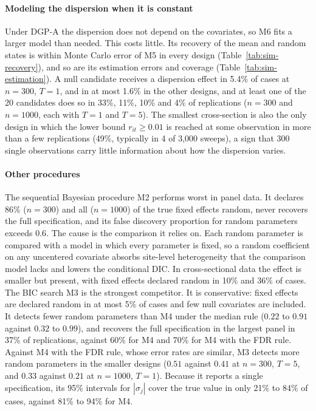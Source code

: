 \paragraph{Modeling the dispersion when it is constant} Under DGP-A the dispersion does not depend on the covariates, so M6 fits a larger model than needed. This costs little. Its recovery of the mean and random states is within Monte Carlo error of M5 in every design (Table~\ref{tab:sim-recovery}), and so are its estimation errors and coverage (Table~\ref{tab:sim-estimation}). A null candidate receives a dispersion effect in 5.4\% of cases at $n=300$, $T=1$, and in at most 1.6\% in the other designs, and at least one of the 20 candidates does so in 33\%, 11\%, 10\% and 4\% of replications ($n=300$ and $n=1000$, each with $T=1$ and $T=5$). The smallest cross-section is also the only design in which the lower bound $r_{it}\ge0.01$ is reached at some observation in more than a few replications (49\%, typically in 4 of 3{,}000 sweeps), a sign that 300 single observations carry little information about how the dispersion varies.

\paragraph{Other procedures} The sequential Bayesian procedure M2 performs worst in panel data. It declares 86\% ($n=300$) and all ($n=1000$) of the true fixed effects random, never recovers the full specification, and its false discovery proportion for random parameters exceeds $0.6$. The cause is the comparison it relies on. Each random parameter is compared with a model in which every parameter is fixed, so a random coefficient on any uncentered covariate absorbs site-level heterogeneity that the comparison model lacks and lowers the conditional DIC. In cross-sectional data the effect is smaller but present, with fixed effects declared random in 10\% and 36\% of cases. The BIC search M3 is the strongest competitor. It is conservative: fixed effects are declared random in at most 5\% of cases and few null covariates are included. It detects fewer random parameters than M4 under the median rule ($0.22$ to $0.91$ against $0.32$ to $0.99$), and recovers the full specification in the largest panel in 37\% of replications, against 60\% for M4 and 70\% for M4 with the FDR rule. Against M4 with the FDR rule, whose error rates are similar, M3 detects more random parameters in the smaller designs ($0.51$ against $0.41$ at $n=300$, $T=5$, and $0.33$ against $0.21$ at $n=1000$, $T=1$). Because it reports a single specification, its 95\% intervals for $|\sigma_j|$ cover the true value in only 21\% to 84\% of cases, against 81\% to 94\% for M4.

